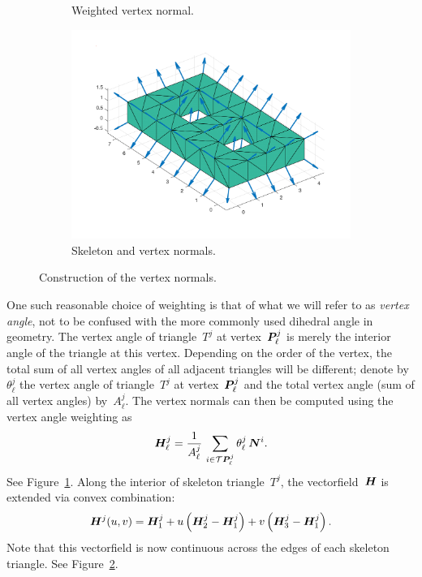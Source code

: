 \documentclass[11pt]{article}
\numberwithin{equation}{section}
\newcommand{\vct}{\vectorsym}
\newcommand{\lp}{\left(}
\newcommand{\rp}{\right)}
\newcommand{\cT}{\mathcal T}
\begin{document}
\begin{figure}[t]
\begin{subfigure}[b]{.3\linewidth}
    \caption{Weighted vertex normal.}
    \label{normalvert2}
  \end{subfigure}
  \hfill
  \begin{subfigure}[b]{.3\linewidth}
    \centering
    \includegraphics[width=\linewidth]{normal_vert_genus_2.pdf}%
    \caption{Skeleton and vertex normals.}
    \label{normalvert3}
  \end{subfigure}
  
  \caption{Construction of the vertex normals.}
  \label{fig:normalverts}
\end{figure}




One such reasonable choice of weighting is that of what we will refer
to as \emph{vertex angle}, not to be confused with the more commonly
used dihedral angle in geometry. The vertex angle of triangle~$T^j$
at vertex~$\vct{P}^j_\ell$ is merely the interior angle of the
triangle at this vertex. Depending on the order of the vertex, the
total sum of all vertex angles of all adjacent triangles will be
different; denote by $\theta^j_\ell$ the vertex angle of
triangle~$T^j$ at vertex~$\vct{P}^j_\ell$ and the total vertex angle
(sum of all vertex angles) by~$A^j_\ell$. The vertex normals can then
be computed using the vertex angle weighting as
\begin{equation}
  \vct{H}^j_\ell = \frac{1}{ A^j_\ell} \, 
  \sum_{i \in \cT \vct{P}^j_\ell} 
  \theta^j_\ell \,  \vct{N}^i.
\end{equation}
See Figure~\ref{normalvert2}.
Along the interior of skeleton triangle~$T^j$, the
vectorfield~$\vct{H}$ is extended via convex combination:
\begin{equation}
  \vct{H}^j(u,v) = \vct{H}^j_1 + u \lp \vct{H}^j_2 - \vct{H}^j_1 \rp
  + v \lp \vct{H}^j_3 - \vct{H}^j_1 \rp.
\end{equation}
Note that this vectorfield is now continuous across the edges of each
skeleton triangle. See Figure~\ref{normalvert3}.
\end{document}
